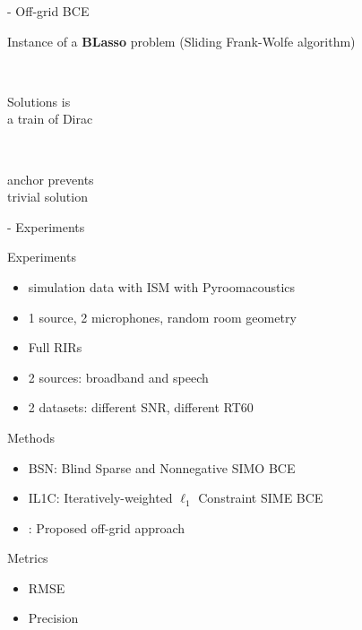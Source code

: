 \begin{frame}{\blaster - Off-grid BCE}
        \begin{center}
            Instance of a \textbf{BLasso} problem \cite{Bredies2013} (Sliding Frank-Wolfe algorithm)
        \end{center}

        \begin{center}

            \textcolor{mygreen}{ \qquad \checkmark \, \parbox{8.5em}{Solutions is \\ a train of Dirac} \qquad \checkmark \, \parbox{8em}{anchor prevents \\ trivial solution}}
        \end{center}
\end{frame}

\begin{frame}{\blaster - Experiments}
    \begin{block}{Experiments}
        \begin{itemize}
            \item simulation data with ISM with Pyroomacoustics
            \item 1 source, 2 microphones, random room geometry
            \item Full RIRs
            \item 2 sources: broadband and speech
            \item 2 datasets: different SNR, different RT60
        \end{itemize}
    \end{block}

    \begin{block}{Methods}
        \begin{itemize}
            \item BSN: Blind Sparse and Nonnegative SIMO BCE~\cite{Lin2007}
            \item IL1C: Iteratively-weighted $\ell_1$ Constraint SIME BCE~\cite{Crocco2015}
            \item \blaster: Proposed off-grid approach
        \end{itemize}
    \end{block}

    \begin{block}{Metrics}
        \begin{itemize}
            \item RMSE
            \item Precision
        \end{itemize}
    \end{block}

\end{frame}

